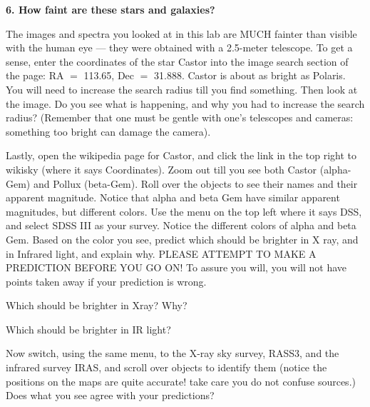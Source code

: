 \vspace{30pt}

\noindent
{\bf 6. How faint are these stars and galaxies?}

\noindent The images and spectra you looked at in this lab are MUCH
fainter than visible with the human eye --- they were obtained with a
2.5-meter telescope. To get a sense, enter the coordinates of the star
Castor into the image search section of the page: RA $=$ 113.65, Dec
$=$ 31.888. Castor is about as bright as Polaris.  You will need to
increase the search radius till you find something. Then look at the
image.  Do you see what is happening, and why you had to increase the
search radius?  (Remember that one must be gentle with one's
telescopes and cameras: something too bright can damage the camera).

\noindent Lastly, open the wikipedia page for Castor, and click the
link in the top right to wikisky (where it says Coordinates). Zoom out
till you see both Castor (alpha-Gem) and Pollux (beta-Gem). Roll over
the objects to see their names and their apparent magnitude. Notice
that alpha and beta Gem have similar apparent magnitudes, but
different colors. Use the menu on the top left where it says DSS, and
select SDSS III as your survey. Notice the different colors of alpha
and beta Gem. Based on the color you see, predict which should be
brighter in X ray, and in Infrared light, and explain why.  PLEASE
ATTEMPT TO MAKE A PREDICTION BEFORE YOU GO ON! To assure you will, you
will not have points taken away if your prediction is wrong.

Which should be brighter in Xray? Why?
\vspace{30pt}

Which should be brighter in IR light?
\vspace{30pt}

Now switch, using the same menu, to the X-ray sky survey, RASS3, and
the infrared survey IRAS, and scroll over objects to identify them
(notice the positions on the maps are quite accurate! take care you do
not confuse sources.) Does what you see agree with your predictions?

\clearpage

